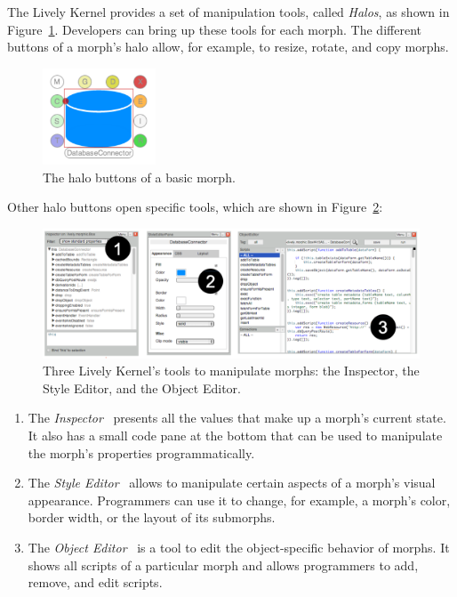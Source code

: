 The Lively Kernel provides a set of manipulation tools, called \emph{Halos}, as shown in Figure~\ref{fig:Halos}.
Developers can bring up these tools for each morph.
The different buttons of a morph's halo allow, for example, to resize, rotate, and copy morphs.

\begin{figure}[h]
    \centering
    \includegraphics[width=0.3\textwidth]{figures/2_background/1_halos.pdf}
    \caption{The halo buttons of a basic morph.}
    \label{fig:Halos}
\end{figure}

Other halo buttons open specific tools, which are shown in Figure~\ref{fig:LivelyTools}:

\begin{figure}[h]
    \centering
    \includegraphics[width=\textwidth]{figures/2_background/2_LivelyTools.pdf}
    \caption{Three Lively Kernel's tools to manipulate morphs: the Inspector, the Style Editor, and the Object Editor.}
    \label{fig:LivelyTools}
\end{figure}

\begin{enumerate}
    \item The \emph{Inspector}~ presents all the values that make up a morph's current state. It also has a small code pane at the bottom that can be used to manipulate the morph's properties programmatically.
    \item The \emph{Style Editor}~ allows to manipulate certain aspects of a morph's visual appearance. Programmers can use it to change, for example, a morph's color, border width, or the layout of its submorphs.
    \item The \emph{Object Editor}~ is a tool to edit the object-specific behavior of morphs. It shows all scripts of a particular morph and allows programmers to add, remove, and edit scripts.
\end{enumerate}


